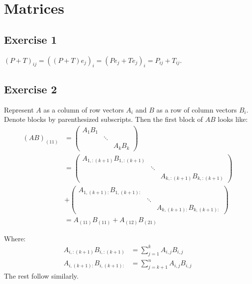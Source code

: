 \section{Matrices}

\subsection{Exercise 1}
$(P + T)_{ij} = ((P + T)e_j)_i = (Pe_j + Te_j)_i = P_{ij} + T_{ij} $.

\subsection{Exercise 2}
Represent $A$ as a column of row vectors $A_i$ and $B$ as a row of column
vectors $B_i$. Denote blocks by parenthesized subscripts.
Then the first block of $AB$ looks like:
\begin{align*}
        (AB)_{(11)} &=
    \begin{pmatrix}
            A_1B_1 & & \\
            & \ddots & \\
            & & A_kB_k
    \end{pmatrix}
    \\
    &=
    \begin{pmatrix}
            A_{1, :(k+1)} B_{1, :(k+1)} & & \\
            & \ddots & \\
            & & A_{k, :(k+1)} B_{k, :(k+1)}
    \end{pmatrix}
    \\
    &+
    \begin{pmatrix}
            A_{1, (k+1):} B_{1, (k+1):} & & \\
            & \ddots & \\
            & & A_{k, (k+1):} B_{k, (k+1):}
    \end{pmatrix}
    \\
    &=
    A_{(11)}B_{(11)} + A_{(12)}B_{(21)}
\end{align*}

Where:
\begin{align*}
        A_{i, :(k+1)} B_{i, :(k+1)} &= \sum_{j=1}^{k} A_{i, j} B_{i, j} \\
        A_{i, (k+1):} B_{i, (k+1):} &= \sum_{j=k+1}^{n} A_{i, j} B_{i, j}
\end{align*}
The rest follow similarly.
